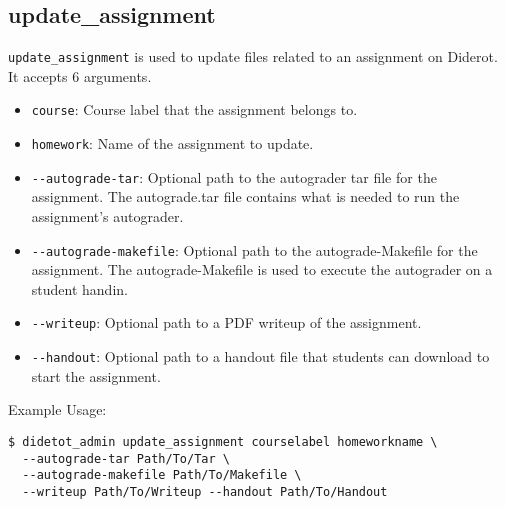 \subsection{update\_assignment}

\verb|update_assignment| is used to update files related to an assignment on Diderot.
%
It accepts 6 arguments.

\begin{itemize}
  \item \verb|course|: Course label that the assignment belongs to.
  \item \verb|homework|: Name of the assignment to update.
  \item \verb|--autograde-tar|: Optional path to the autograder tar file for the assignment. The autograde.tar file contains what is needed to run the assignment's autograder.
  \item \verb|--autograde-makefile|: Optional path to the autograde-Makefile for the assignment. The autograde-Makefile is used to execute the autograder on a student handin.
  \item \verb|--writeup|: Optional path to a PDF writeup of the assignment.
  \item \verb|--handout|: Optional path to a handout file that students can download to start the assignment.
\end{itemize}

Example Usage:
\begin{verbatim}
$ didetot_admin update_assignment courselabel homeworkname \
  --autograde-tar Path/To/Tar \
  --autograde-makefile Path/To/Makefile \
  --writeup Path/To/Writeup --handout Path/To/Handout
\end{verbatim}

